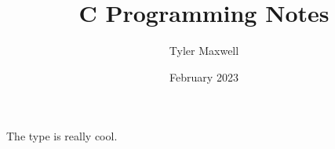 \documentclass[twocolumn]{article}
\title{C Programming Notes}
\author{Tyler Maxwell}
\date{February 2023}
\begin{document}
\maketitle

The \Gls{type} is really cool.






\clearpage
\printglossaries
\end{document}
